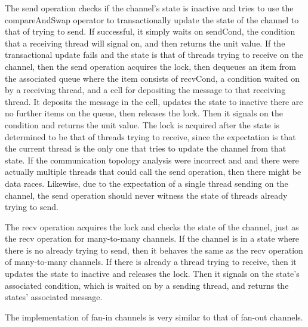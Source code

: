 The send operation checks if the channel's state is inactive and tries to use the
compareAndSwap operator to transactionally update the state of the channel to that of trying to
send.  If successful, it simply waits on sendCond, the condition that a receiving thread will
signal on, and then returns the unit value.  If the transactional update fails and the state is
that of threads trying to receive on the channel, then the send operation acquires the lock,
then dequeues an item from the associated queue where the item consists of recvCond, a
condition waited on by a receiving thread, and a cell for depositing the message to that
receiving thread.  It deposits the message in the cell, updates the state to inactive there are
no further items on the queue, then releases the lock.  Then it signals on the condition and
returns the unit value. The lock is acquired after the state is determined to be that of
threads trying to receive, since the expectation is that the current thread is the only one
that tries to update the channel from that state.  If the communication topology analysis were
incorrect and and there were actually multiple threads that could call the send operation, then
there might be data races.  Likewise, due to the expectation of a single thread sending on the
channel, the send operation should never witness the state of threads already trying to send.

The recv operation acquires the lock and checks the state of the channel, just as the recv
operation for many-to-many channels.  If the channel is in a state where there is no already
trying to send, then it behaves the same as the recv operation of many-to-many channels. If
there is already a thread trying to receive, then it updates the state to inactive and releases
the lock.  Then it signals on the state's associated condition, which is waited on by a sending
thread, and returns the states' associated message.

The implementation of fan-in channels is very similar to that of fan-out channels.

